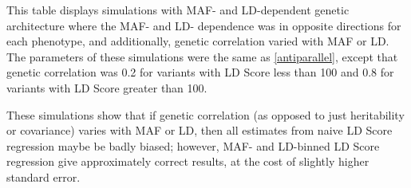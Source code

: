 This table displays simulations with MAF- and LD-dependent genetic architecture where the MAF- and LD- dependence was in opposite directions for each phenotype, and additionally, genetic correlation varied with MAF or LD. The parameters of these simulations were the same as \ref{antiparallel}, except that genetic correlation was 0.2 for variants with LD Score less than 100 and 0.8 for variants with LD Score greater than 100. 

These simulations show that if genetic correlation (as opposed to just heritability or covariance) varies with MAF or LD, then all estimates from naive LD Score regression maybe be badly biased; however, MAF- and LD-binned LD Score regression give approximately correct results, at the cost of slightly higher standard error.